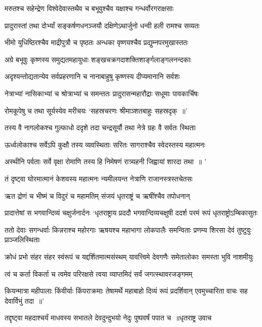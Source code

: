 \twolineshloka
{मरुतश्च सहेन्द्रेण विश्वेदेवास्तथैव च}
{बभूवुश्चैव यक्षाश्च गन्धर्वोरगराक्षसाः}


\twolineshloka
{प्रादुरास्तां तथा दोर्भ्यां सङ्कर्षणधनञ्जयौ}
{दक्षिणेऽथार्जुनो धन्वी हली रामश्च सव्यतः}


\twolineshloka
{भीमो युधिष्ठिरश्चैव माद्रीपुत्रौ च पृष्ठतः}
{अन्धका वृष्णयश्चैव प्रद्युम्नपरमुखास्ततः}


\twolineshloka
{अग्रे बभूवुः कृष्णस्य समुद्यतमहायुधाः}
{शङ्खचक्रगदाशक्तिशार्ङ्गलाङ्गलनन्दकाः}


\twolineshloka
{अदृश्यन्तोद्यतान्येव सर्वप्रहरणानि च}
{नानाबाहुषु कृष्णस्य दीप्यमानानि सर्वशः}


\twolineshloka
{नेत्राभ्यां नासिकाभ्यां च श्रोत्राभ्यां च समन्ततः}
{प्रादुरासन्महारौद्राः सधूमाः पावकार्चिषः}


\twolineshloka
{रोमकूपेषु च तथा सूर्यस्येव मरीचयः}
{`सहस्रचरणः श्रीमाञ्शतबाहुः सहस्रदृक् ॥'}


\twolineshloka
{तस्य वै नागलोकश्च गुल्फाधो ददृशे तदा}
{चन्द्रसूर्यौ तथा नेत्रे ग्रहः वै सर्वतः स्थिताः}


\twolineshloka
{ऊर्ध्वलोकाश्च सर्वेऽपि कुक्षौ तस्य व्यवस्थिताः}
{सरितः सागराश्चैव स्वेदस्तस्य महात्मनः}


\twolineshloka
{अस्थीनि पर्वताः सर्वे वृक्षा रोमाणि तस्य हि}
{निमेषणं रात्र्यहनी जिह्वायां शारदा तथा ॥ '}


\twolineshloka
{तं दृष्ट्वा घोरमात्मानं केशवस्य महात्मनः}
{न्यमीलयन्त नेत्राणि राजानस्त्रस्तचेतसः}


\twolineshloka
{ऋत द्रोणं च भीष्मं च विदुरं च महामतिम्}
{संजयं धृतराष्ट्रं च ऋषींश्चैव तपोधनान्}


प्रादात्तेषां स भगवान्दिव्यं चक्षुर्जनार्दनः
\twolineshloka
{`धृतराष्ट्राय प्रददौ भगवान्दिव्यचक्षुषी}
{ददर्श परमं रूपं धृतराष्ट्रोऽम्बिकासुतः}


\threelineshloka
{ततो देवाः सगन्धर्वाः किन्नराश्च महोरगाः}
{ऋषयश्च महाभागा लोकपालैः समन्विताः}
{प्रणम्य शिरसा देवं तुष्टुवुः प्राञ्जलिस्थिताः}


\twolineshloka
{क्रोधं प्रभो संहर संहर स्वंरूपं च यद्दर्शितमात्मसंस्थम्}
{यावत्त्विमे देवगणैः समेतालोकाः समस्ता भुवि नाशमीयुः}


\twolineshloka
{त्वं च कर्ता विकर्ता च त्वमेव परिरक्षसे}
{त्वया व्याप्तमिदं सर्वं जगत्स्थावरजङ्गमम्}


\threelineshloka
{कियन्मात्रा महीपालाः किंवीर्याः किंपराक्रमाः}
{तेषामर्थे महाबाहो दिव्यं रूपं प्रदर्शिवान्}
{एवमुच्चारिता वाचः सह देवार्विभुं तदा ॥'}


\threelineshloka
{तद्दृष्ट्वा महदाश्चर्यं माधवस्य सभातले}
{देवदुन्दुभयो नेदुः पुष्पवर्षं पपात च ॥धृतराष्ट्र उवाच}
{}


